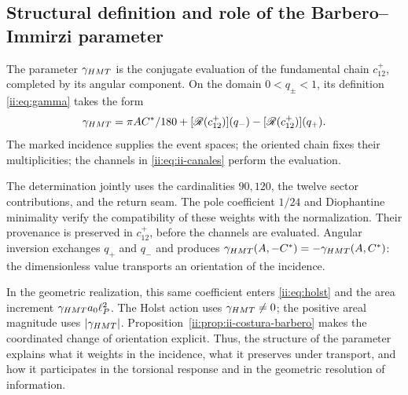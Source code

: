 \subsection{Structural definition and role of the Barbero--Immirzi parameter}
\label{ii:sec:ii-definicion-barbero}

\begin{definition}
The parameter \(\gamma_{HMT}\) is the conjugate evaluation of the
fundamental chain \(c_{12}^{+}\), completed by its angular
component. On the domain \(0<q_\pm<1\), its definition
\eqref{ii:eq:gamma} takes the form
\begin{equation}
 \gamma_{\HMT}
 =\frac{\pi AC^*}{180}
  +[\mathscr R(c_{12}^{+})](q_-)
  -[\mathscr R(c_{12}^{+})](q_+).
 \label{ii:eq:ii-definicion-barbero-evaluacion}
\end{equation}
The marked incidence supplies the event spaces; the oriented
chain fixes their multiplicities; the channels in
\eqref{ii:eq:ii-canales} perform the evaluation.
\end{definition}

The determination jointly uses the cardinalities \(90,120\),
the twelve sector contributions, and the return seam. The
pole coefficient \(1/24\) and Diophantine minimality verify
the compatibility of these weights with the normalization. Their provenance
is preserved in \(c_{12}^{+}\), before the channels are evaluated. Angular
inversion exchanges \(q_+\) and \(q_-\) and produces
\(\gamma_{HMT}(A,-C^*)=-\gamma_{HMT}(A,C^*)\): the dimensionless
value transports an orientation of the incidence.

In the geometric realization, this same coefficient enters
\eqref{ii:eq:holst} and the area increment
\(\gamma_{HMT}a_0\ell_P^2\). The Holst action uses
\(\gamma_{HMT}\ne0\); the positive areal magnitude uses
\(|\gamma_{HMT}|\). Proposition~\ref{ii:prop:ii-costura-barbero}
makes the coordinated change of orientation explicit. Thus, the structure
of the parameter explains what it weights in the incidence, what it preserves
under transport, and how it participates in the torsional response and in
the geometric resolution of information.
